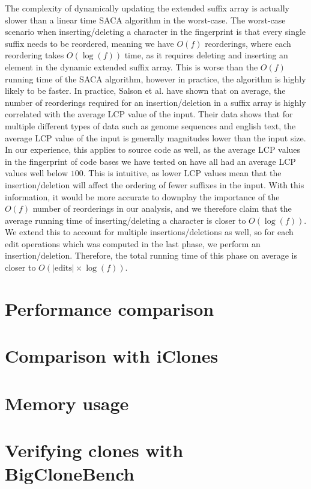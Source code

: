 The complexity of dynamically updating the extended suffix array is actually slower than a
linear time SACA algorithm in the worst-case. The worst-case scenario when
inserting/deleting a character in the fingerprint is that every single suffix needs to be
reordered, meaning we have $O(f)$ reorderings, where each reordering takes $O(\log(f))$
time, as it requires deleting and inserting an element in the dynamic extended suffix
array. This is worse than the $O(f)$ running time of the SACA algorithm, however in
practice, the algorithm is highly likely to be faster. In practice, Salson et
al.\cite{DynamicExtendedSuffixArraysReorderings} have shown that on average, the number of
reorderings required for an insertion/deletion in a suffix array is highly correlated with
the average LCP value of the input. Their data shows that for multiple different types of
data such as genome sequences and english text, the average LCP value of the input is
generally magnitudes lower than the input size. In our experience, this applies to source
code as well, as the average LCP values in the fingerprint of code bases we have tested on
have all had an average LCP values well below $100$. This is intuitive, as lower LCP
values mean that the insertion/deletion will affect the ordering of fewer suffixes in the
input. With this information, it would be more accurate to downplay the importance of the
$O(f)$ number of reorderings in our analysis, and we therefore claim that the average
running time of inserting/deleting a character is closer to $O(\log(f))$. We extend this
to account for multiple insertions/deletions as well, so for each edit operations which
was computed in the last phase, we perform an insertion/deletion. Therefore, the total
running time of this phase on average is closer to $O(\vert\text{edits}\vert \times
\log(f))$.



\section{Performance comparison}


\section{Comparison with iClones}

\section{Memory usage}

\section{Verifying clones with BigCloneBench}
